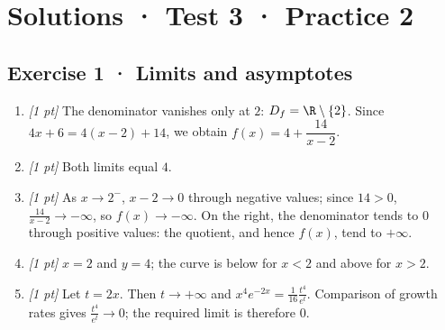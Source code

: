 \ifprof\clearpage

\section*{Solutions · Test 3 · Practice 2}\label{cor:4-2}

\subsection*{Exercise 1 · Limits and asymptotes}\begin{enumerate}

\item \textit{[1 pt]} The denominator vanishes only at $2$: $D_f=\R\setminus\{2\}$. Since $4x+6=4(x-2)+14$, we obtain $f(x)=4+\dfrac{14}{x-2}$.

\item \textit{[1 pt]} Both limits equal $4$.

\item \textit{[1 pt]} As $x\to 2^-$, $x-2\to0$ through negative values; since $14>0$, $\frac{14}{x-2}\to-\infty$, so $f(x)\to-\infty$. On the right, the denominator tends to $0$ through positive values: the quotient, and hence $f(x)$, tend to $+\infty$.

\item \textit{[1 pt]} $x=2$ and $y=4$; the curve is below for $x<2$ and above for $x>2$.

\item \textit{[1 pt]} Let $t=2x$. Then $t\to+\infty$ and $x^4e^{-2x}=\frac{1}{16}\frac{t^4}{e^t}$. Comparison of growth rates gives $\frac{t^4}{e^t}\to0$; the required limit is therefore $0$.

\end{enumerate}

